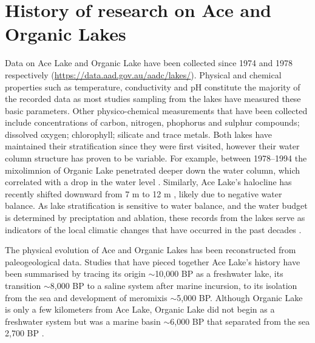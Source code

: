 \section{History of research on Ace and Organic Lakes}
Data on Ace Lake and Organic Lake have been collected since 1974 and 1978 respectively 
(\url{https://data.aad.gov.au/aadc/lakes/}).
Physical and chemical properties such as temperature, conductivity and pH constitute the majority of the recorded data as most studies sampling from the lakes have measured these basic parameters.
Other physico-chemical measurements that have been collected include concentrations of carbon, nitrogen, phophorus and sulphur compounds; dissolved oxygen; chlorophyll; silicate and trace metals.
Both lakes have maintained their stratification since they were first visited, however their water column structure has proven to be variable.
For example, between 1978--1994 the mixolimnion of Organic Lake penetrated deeper down the water column, which correlated with a drop in the water level \cite{Gibson1995, Gibson1996}.
Similarly, Ace Lake's halocline has recently shifted downward from 7 m \cite{Rankin1999} to 12 m \cite{Lauro2011}, likely due to negative water balance.
As lake stratification is sensitive to water balance, and the water budget is determined by preciptation and ablation, these records from the lakes serve as indicators of the local climatic changes that have occurred in the past decades \cite{Gibson1995}.

The physical evolution of Ace and Organic Lakes has been reconstructed from paleogeological data.
Studies that have pieced together Ace Lake's history have been summarised by \citet{Rankin1999} tracing its origin $\sim$10,000 BP as a freshwater lake, its transition $\sim$8,000 BP to a saline system after marine incursion, to its isolation from the sea and development of meromixis $\sim$5,000 BP.
Although Organic Lake is only a few kilometers from Ace Lake, Organic Lake did not begin as a freshwater system but was a marine basin $\sim$6,000 BP that separated from the sea 2,700 BP \cite{Bird1991, Zwartz1998}.

